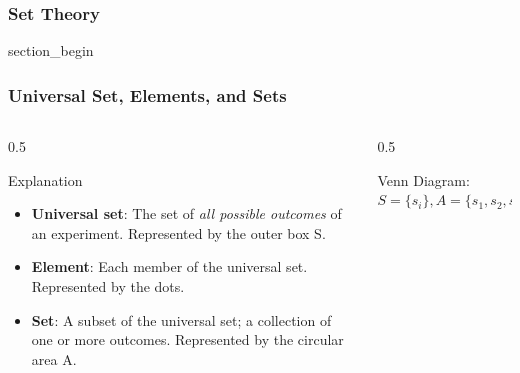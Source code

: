 \subsubsection{Set Theory}
\begin{frame} \vfill \centering \begin{beamercolorbox}[sep=10pt,center,shadow=false,rounded=true]{section_begin} \insertsubsubsectionhead\par \end{beamercolorbox} \vfill \end{frame}
\begin{frame}
    \frametitle{Universal Set, Elements, and Sets}
    \vspace{-2mm}
    \begin{columns}[T]
        \begin{column}{0.5\textwidth}
            \begin{block}{Explanation}
                \begin{itemize}
                    \item \textbf{Universal set}: The set of \textit{all possible outcomes} of an experiment. Represented by the outer box S.
                    \item \textbf{Element}: Each member of the universal set. Represented by the dots.
                    \item \textbf{Set}: A subset of the universal set; a collection of one or more outcomes. Represented by the circular area A.
                \end{itemize}
            \end{block}
        \end{column}
        
        \begin{column}{0.5\textwidth}
            \begin{block}{Venn Diagram: \(S=\{s_i\},A=\{s_1,s_2,s_3,s_4\}\)}
                \centering
            \end{block}
        \end{column}
    \end{columns}
\end{frame}

